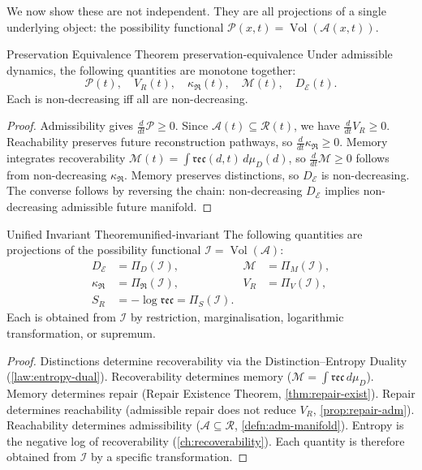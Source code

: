 \documentclass[12pt,twoside,openright]{book}
\newcommand{\reach}{\mathcal{R}}
\newcommand{\adm}{\mathcal{A}}
\newcommand{\repair}{\mathfrak{R}}
\newcommand{\reco}{\mathfrak{rec}}
\newcommand{\Vol}{\operatorname{Vol}}
\begin{document}
We now show these are not independent. They are all
projections of a single underlying object: the
possibility functional $\mathcal{P}(x,t) = \Vol(\adm(x,t))$.

\begin{theorem}{Preservation Equivalence Theorem}%
  {preservation-equivalence}
  Under admissible dynamics, the following quantities
  are monotone together:
  \[
    \mathcal{P}(t),\quad
    V_R(t),\quad
    \kappa_\repair(t),\quad
    \mathcal{M}(t),\quad
    D_\mathcal{E}(t).
  \]
  Each is non-decreasing iff all are non-decreasing.
\end{theorem}

\begin{proof}
  Admissibility gives $\frac{d}{dt}\mathcal{P} \ge 0$.
  Since $\adm(t) \subseteq \reach(t)$, we have
  $\frac{d}{dt}V_R \ge 0$.
  Reachability preserves future reconstruction pathways,
  so $\frac{d}{dt}\kappa_\repair \ge 0$.
  Memory integrates recoverability
  $\mathcal{M}(t) = \int \reco(d,t)\,d\mu_D(d)$,
  so $\frac{d}{dt}\mathcal{M} \ge 0$ follows from
  non-decreasing $\kappa_\repair$.
  Memory preserves distinctions, so $D_\mathcal{E}$
  is non-decreasing.
  The converse follows by reversing the chain:
  non-decreasing $D_\mathcal{E}$ implies non-decreasing
  admissible future manifold.
\end{proof}

\begin{theorem}{Unified Invariant Theorem}{unified-invariant}
  The following quantities are projections of the
  possibility functional $\mathcal{I} = \Vol(\adm)$:
  \begin{align*}
    D_\mathcal{E} &= \Pi_D(\mathcal{I}), &
    \mathcal{M} &= \Pi_M(\mathcal{I}), \\
    \kappa_\repair &= \Pi_\repair(\mathcal{I}), &
    V_R &= \Pi_V(\mathcal{I}), \\
    S_R &= -\log\reco = \Pi_S(\mathcal{I}).
  \end{align*}
  Each is obtained from $\mathcal{I}$ by restriction,
  marginalisation, logarithmic transformation, or
  supremum.
\end{theorem}

\begin{proof}
  Distinctions determine recoverability via the
  Distinction--Entropy Duality (\cref{law:entropy-dual}).
  Recoverability determines memory
  ($\mathcal{M} = \int\reco\,d\mu_D$).
  Memory determines repair (Repair Existence Theorem,
  \cref{thm:repair-exist}).
  Repair determines reachability (admissible repair
  does not reduce $V_R$, \cref{prop:repair-adm}).
  Reachability determines admissibility
  ($\adm \subseteq \reach$, \cref{defn:adm-manifold}).
  Entropy is the negative log of recoverability
  (\cref{ch:recoverability}).
  Each quantity is therefore obtained from
  $\mathcal{I}$ by a specific transformation.
\end{proof}
\end{document}
